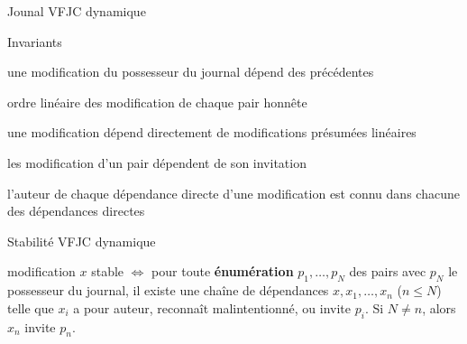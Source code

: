 \begin{frame}{Jounal \acf{VFJC} dynamique}
    \begin{block}{Invariants}
        \begin{compactenumerate}
            \item {une modification du possesseur du journal dépend des précédentes}
            \item {ordre linéaire des modification de chaque pair honnête}
            \item {une modification dépend directement de modifications présumées linéaires}
            \item {les modification d'un pair dépendent de son invitation}
            \item l'auteur de chaque dépendance directe d'une modification est connu dans chacune des dépendances directes
        \end{compactenumerate}
    \end{block}
\end{frame}


\begin{frame}{Stabilité \acf{VFJC} dynamique}
    \begin{theorem}
        modification $x$ stable $\iff$ pour toute \textbf{énumération} $p_1, \dotsc, p_N$ des pairs avec $p_N$ le possesseur du journal, il existe une chaîne de dépendances $x, x_1, \dotsc, x_n$ ($n \leq N$) telle que $x_i$ a pour auteur, reconnaît malintentionné, ou invite $p_i$. Si $N \neq n$, alors $x_n$ invite $p_n$.
    \end{theorem}
\end{frame}


